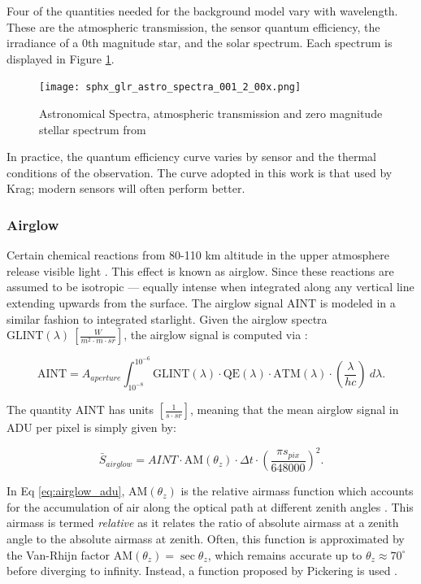 Four of the quantities needed for the background model vary with wavelength. These are the atmospheric transmission, the sensor quantum efficiency, the irradiance of a 0th magnitude star, and the solar spectrum. Each spectrum is displayed in Figure \ref{fig:spectra}.

\begin{figure}[ht]
  \centering
  \texttt{[image: sphx\_glr\_astro\_spectra\_001\_2\_00x.png]}
  \caption{Astronomical Spectra, atmospheric transmission and zero magnitude stellar spectrum from \cite{krag2003}}
  \label{fig:spectra}
\end{figure}

In practice, the quantum efficiency curve varies by sensor and the thermal conditions of the
observation. The curve adopted in this work is that used by Krag; modern sensors will often
perform better.

\subsubsection{Airglow}

Certain chemical reactions from 80-110 km altitude in the upper atmosphere release visible light
\cite{krag2003}. This effect is known as
airglow. Since these reactions are assumed to be isotropic ---  equally intense when integrated along any
vertical line extending upwards from the surface. The airglow signal $\textrm{AINT}$ is modeled in a
similar fashion to integrated starlight. Given the airglow spectra $\textrm{GLINT}(\lambda) \:
\left[ \frac{W}{m^2\cdot m \cdot sr} \right]$, the airglow signal is computed via \cite{krag2003}:

\begin{equation} \label{eq:aint}
 \textrm{AINT} = A_{aperture}
  \int_{10^{-8}}^{10^{-6}}{ \textrm{GLINT}(\lambda) \cdot \textrm{QE}(\lambda) \cdot \textrm{ATM}(\lambda)
  \cdot \left( \frac{\lambda}{h c} \right) \: d\lambda}.
\end{equation}

The quantity $\textrm{AINT}$ has units $\left[ \frac{1}{s\cdot sr} \right]$, meaning that the
mean airglow signal in ADU per pixel is simply given by:

\begin{equation} \label{eq:airglow_adu}
  \bar{S}_{airglow} = AINT \cdot \textrm{AM}(\theta_z) \cdot \Delta t \cdot \left( \frac{\pi s_{pix}}{648000} \right)^2.
\end{equation}

In Eq \ref{eq:airglow_adu}, $\textrm{AM}(\theta_z)$ is the relative airmass function which accounts for the accumulation of air along the optical path at different zenith angles \cite{frueh2019notes}. This airmass is termed \textit{relative} as it relates the ratio of absolute airmass at a zenith angle to the absolute airmass at zenith. Often, this function is approximated by the Van-Rhijn factor $\textrm{AM}(\theta_z) = \sec{\theta_z}$, which remains accurate up to $\theta_z \approx 70^\circ$ before diverging to infinity. Instead, a function proposed by Pickering is used \cite{pickering2002}.

